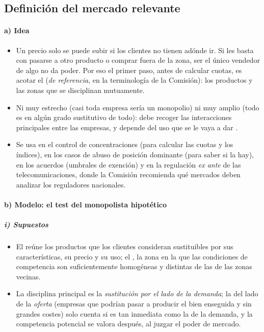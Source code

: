 \documentclass[11pt]{article}
\begin{document}
\subsection{Definición del mercado relevante}\label{sec:mercado-relevante}

\paragraph{a) Idea}

\begin{itemize}
\item Un precio solo se puede subir si los clientes no tienen adónde ir. Si les basta con pasarse a otro producto o comprar fuera de la zona, ser el único vendedor de algo no da poder. Por eso el primer paso, antes de calcular cuotas, es acotar el  (\emph{de referencia}, en la terminología de la Comisión): los productos y las zonas que se disciplinan mutuamente\nocite{CE2024DefinicionMercado}.
\item Ni muy estrecho (casi toda empresa sería un monopolio) ni muy amplio (todo es en algún grado sustitutivo de todo): debe recoger las interacciones principales entre las empresas, y depende del uso que se le vaya a dar\nocite{Tirole1988Theory} .
\item Se usa en el control de concentraciones (para calcular las cuotas y los índices), en los casos de abuso de posición dominante (para saber si la hay), en los acuerdos (umbrales de exención) y en la regulación \emph{ex ante} de las telecomunicaciones, donde la Comisión recomienda qué mercados deben analizar los reguladores nacionales\nocite{UE2020RecomendacionMercados}.
\end{itemize}

\paragraph{b) Modelo: el test del monopolista hipotético}

\subparagraph{i) Supuestos}

\begin{itemize}
\item El  reúne los productos que los clientes consideran sustituibles por sus características, su precio y su uso; el , la zona en la que las condiciones de competencia son suficientemente homogéneas y distintas de las de las zonas vecinas\nocite{CE2024DefinicionMercado}.
\item La disciplina principal es la \emph{sustitución por el lado de la demanda}; la del lado de la \emph{oferta} (empresas que podrían pasar a producir el bien enseguida y sin grandes costes) solo cuenta si es tan inmediata como la de la demanda, y la competencia potencial se valora después, al juzgar el poder de mercado.
\end{itemize}
\end{document}
